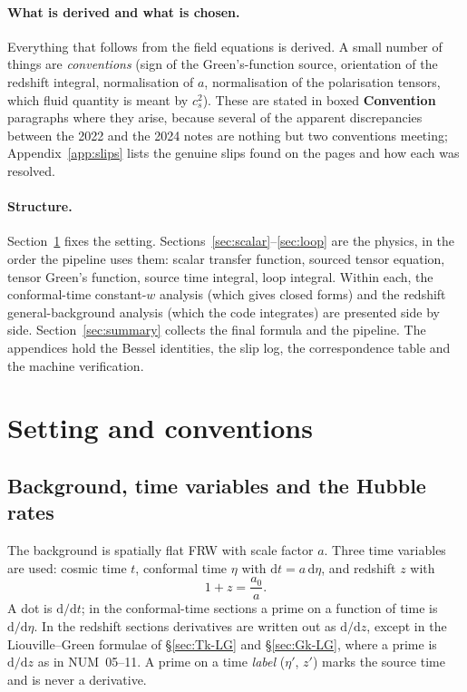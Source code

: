 \documentclass[11pt,a4paper]{article}
\newcommand{\dd}{\mathrm{d}}
\newcommand{\note}[1]{\textsf{#1}}
\theoremstyle{remark}
\begin{document}
\paragraph{What is derived and what is chosen.} Everything that follows from the field equations is derived. A small number of things are \emph{conventions} (sign of the Green's-function source, orientation of the redshift integral, normalisation of $a$, normalisation of the polarisation tensors, which fluid quantity is meant by $c_s^2$). These are stated in boxed \textbf{Convention} paragraphs where they arise, because several of the apparent discrepancies between the 2022 and the 2024 notes are nothing but two conventions meeting; Appendix~\ref{app:slips} lists the genuine slips found on the pages and how each was resolved.

\paragraph{Structure.} Section~\ref{sec:setup} fixes the setting. Sections~\ref{sec:scalar}--\ref{sec:loop} are the physics, in the order the pipeline uses them: scalar transfer function, sourced tensor equation, tensor Green's function, source time integral, loop integral. Within each, the conformal-time constant-$w$ analysis (which gives closed forms) and the redshift general-background analysis (which the code integrates) are presented side by side. Section~\ref{sec:summary} collects the final formula and the pipeline. The appendices hold the Bessel identities, the slip log, the correspondence table and the machine verification.

\section{Setting and conventions}
\label{sec:setup}

\subsection{Background, time variables and the Hubble rates}

The background is spatially flat FRW with scale factor $a$. Three time variables are used: cosmic time $t$, conformal time $\eta$ with $\dd t = a\,\dd\eta$, and redshift $z$ with
\begin{equation}
1+z = \frac{a_0}{a}.
\label{eq:z-def}
\end{equation}
A dot is $\dd/\dd t$; in the conformal-time sections a prime on a function of time is $\dd/\dd\eta$. In the redshift sections derivatives are written out as $\dd/\dd z$, except in the Liouville--Green formulae of \S\ref{sec:Tk-LG} and \S\ref{sec:Gk-LG}, where a prime is $\dd/\dd z$ as in \note{NUM}~05--11. A prime on a time \emph{label} ($\eta'$, $z'$) marks the source time and is never a derivative.
\end{document}
